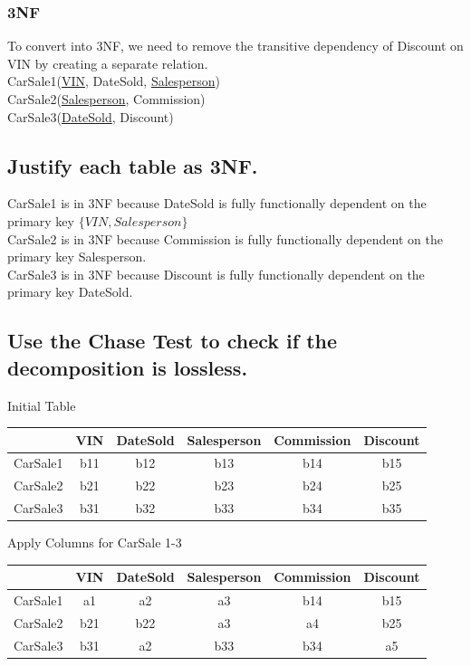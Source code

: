 \documentclass{article}
\begin{document}
\subsubsection{3NF}
To convert into 3NF, we need to remove the transitive dependency of Discount on VIN by creating a separate relation. \\
CarSale1(\underline{VIN}, DateSold, \underline{Salesperson}) \\
CarSale2(\underline{Salesperson}, Commission) \\
CarSale3(\underline{DateSold}, Discount) \\
\subsection{Justify each table as 3NF.}
CarSale1 is in 3NF because DateSold is fully functionally dependent on the primary key $\{VIN, Salesperson\}$ \\
CarSale2 is in 3NF because Commission is fully functionally dependent on the primary key Salesperson. \\
CarSale3 is in 3NF because Discount is fully functionally dependent on the primary key DateSold.
\subsection{Use the Chase Test to check if the decomposition is lossless.}
\begin{table}[H]{Initial Table}
\begin{tabular}{|c|c|c|c|c|c|}
    \hline
    & VIN & DateSold & Salesperson & Commission & Discount \\
    \hline
    CarSale1 & b11 & b12 & b13 & b14 & b15 \\
    \hline
    CarSale2 & b21 & b22 & b23 & b24 & b25 \\
    \hline
    CarSale3 & b31 & b32 & b33 & b34 & b35 \\
    \hline
    \end{tabular}
\end{table}
\begin{table}[H]{Apply Columns for CarSale 1-3}
\begin{tabular}{|c|c|c|c|c|c|}
    \hline
    & VIN & DateSold & Salesperson & Commission & Discount \\
    \hline
    CarSale1 & a1 & a2 & a3 & b14 & b15 \\
    \hline
    CarSale2 & b21 & b22 & a3 & a4 & b25 \\
    \hline
    CarSale3 & b31 & a2 & b33 & b34 & a5 \\
    \hline
    \end{tabular}
\end{table}
\end{document}
